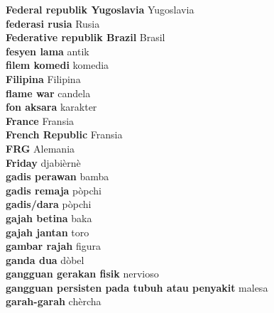 \textbf{ Federal republik Yugoslavia  } Yugoslavia \\
\textbf{ federasi rusia  } Rusia \\
\textbf{ Federative republik Brazil  } Brasil \\
\textbf{ fesyen lama  } antik \\
\textbf{ filem komedi  } komedia \\
\textbf{ Filipina  } Filipina \\
\textbf{ flame war  } candela \\
\textbf{ fon aksara  } karakter \\
\textbf{ France  } Fransia \\
\textbf{ French Republic  } Fransia \\
\textbf{ FRG  } Alemania \\
\textbf{ Friday  } djabièrnè \\
\textbf{ gadis perawan  } bamba \\
\textbf{ gadis remaja  } pòpchi \\
\textbf{ gadis/dara  } pòpchi \\
\textbf{ gajah betina  } baka \\
\textbf{ gajah jantan  } toro \\
\textbf{ gambar rajah  } figura \\
\textbf{ ganda dua  } dòbel \\
\textbf{ gangguan gerakan fisik  } nervioso \\
\textbf{ gangguan persisten pada tubuh atau penyakit  } malesa \\
\textbf{ garah-garah  } chèrcha \\
